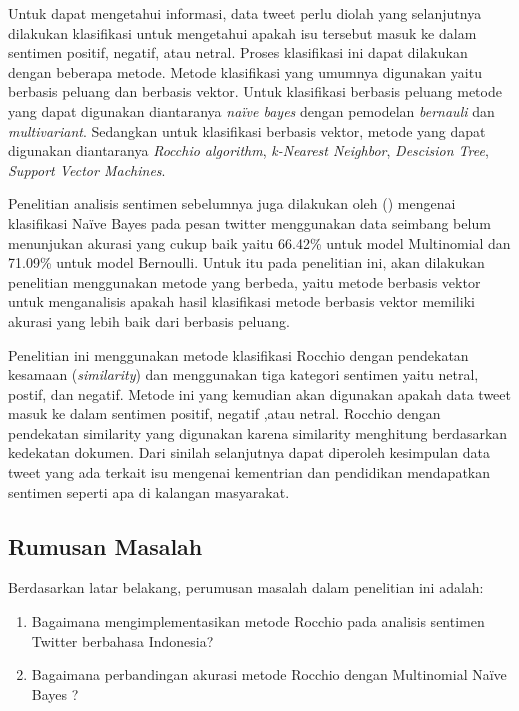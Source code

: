 Untuk dapat mengetahui informasi, data tweet perlu diolah yang selanjutnya dilakukan klasifikasi untuk mengetahui apakah isu tersebut masuk ke dalam sentimen positif, negatif, atau netral. Proses klasifikasi ini dapat dilakukan dengan beberapa metode. Metode klasifikasi yang umumnya digunakan yaitu berbasis peluang dan berbasis vektor. Untuk klasifikasi berbasis peluang metode yang dapat digunakan diantaranya \textit{naïve bayes} dengan pemodelan \textit{bernauli} dan \textit{multivariant}. Sedangkan untuk klasifikasi berbasis vektor, metode yang dapat digunakan diantaranya \textit{Rocchio algorithm}, \textit{k-Nearest Neighbor}, \textit{Descision Tree}, \textit{Support Vector Machines}.

Penelitian analisis sentimen sebelumnya juga dilakukan oleh \citeauthor{ADITYAWAN2014} (\cite*{ADITYAWAN2014}) mengenai klasifikasi Naïve Bayes pada pesan twitter menggunakan data seimbang belum menunjukan akurasi yang cukup baik yaitu 66.42\% untuk model Multinomial dan 71.09\% untuk model Bernoulli. Untuk itu pada penelitian ini, akan dilakukan penelitian menggunakan metode yang berbeda, yaitu metode berbasis vektor untuk menganalisis apakah hasil klasifikasi metode berbasis vektor memiliki akurasi yang lebih baik dari berbasis peluang. 

Penelitian ini menggunakan metode klasifikasi Rocchio dengan pendekatan kesamaan (\textit{similarity}) dan menggunakan tiga kategori sentimen yaitu netral, postif, dan negatif. Metode ini yang kemudian akan digunakan apakah data tweet masuk ke dalam sentimen positif, negatif ,atau netral. Rocchio dengan pendekatan similarity yang digunakan  karena similarity menghitung berdasarkan kedekatan dokumen. Dari sinilah selanjutnya dapat diperoleh kesimpulan data tweet yang ada terkait isu mengenai kementrian dan pendidikan mendapatkan sentimen seperti apa di kalangan masyarakat. 


\subsection*{Rumusan Masalah}
Berdasarkan latar belakang, perumusan masalah dalam penelitian ini adalah: 
\begin{enumerate}[noitemsep] 
	\item Bagaimana mengimplementasikan metode Rocchio pada analisis sentimen Twitter berbahasa Indonesia?
	\item Bagaimana perbandingan akurasi metode Rocchio dengan Multinomial Naïve Bayes ?

\end{enumerate}

